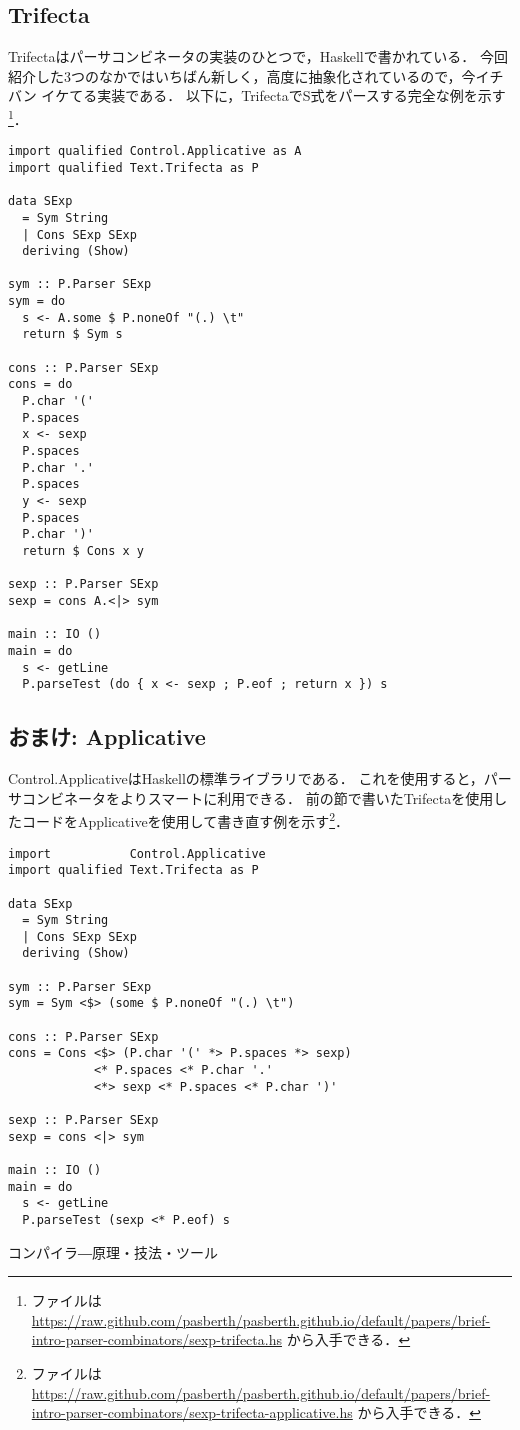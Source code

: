 \documentclass{jarticle}
\begin{document}
\subsection{Trifecta}

Trifectaはパーサコンビネータの実装のひとつで，Haskellで書かれている．
今回紹介した3つのなかではいちばん新しく，高度に抽象化されているので，今イチバン
イケてる実装である．
以下に，TrifectaでS式をパースする完全な例を示す\footnote{
ファイルは
\url{https://raw.github.com/pasberth/pasberth.github.io/default/papers/brief-intro-parser-combinators/sexp-trifecta.hs}
から入手できる．}．
\lstset{basicstyle=\ttfamily,}
\begin{lstlisting}
import qualified Control.Applicative as A
import qualified Text.Trifecta as P

data SExp
  = Sym String
  | Cons SExp SExp
  deriving (Show)

sym :: P.Parser SExp
sym = do
  s <- A.some $ P.noneOf "(.) \t"
  return $ Sym s

cons :: P.Parser SExp
cons = do
  P.char '('
  P.spaces
  x <- sexp
  P.spaces
  P.char '.'
  P.spaces
  y <- sexp
  P.spaces
  P.char ')'
  return $ Cons x y

sexp :: P.Parser SExp
sexp = cons A.<|> sym

main :: IO ()
main = do
  s <- getLine
  P.parseTest (do { x <- sexp ; P.eof ; return x }) s
\end{lstlisting}

\subsection{おまけ: Applicative}

Control.ApplicativeはHaskellの標準ライブラリである．
これを使用すると，パーサコンビネータをよりスマートに利用できる．
前の節で書いたTrifectaを使用したコードをApplicativeを使用して書き直す例を示す\footnote{
ファイルは
\url{https://raw.github.com/pasberth/pasberth.github.io/default/papers/brief-intro-parser-combinators/sexp-trifecta-applicative.hs}
から入手できる．}．
\begin{lstlisting}
import           Control.Applicative
import qualified Text.Trifecta as P

data SExp
  = Sym String
  | Cons SExp SExp
  deriving (Show)

sym :: P.Parser SExp
sym = Sym <$> (some $ P.noneOf "(.) \t")

cons :: P.Parser SExp
cons = Cons <$> (P.char '(' *> P.spaces *> sexp)
            <* P.spaces <* P.char '.'
            <*> sexp <* P.spaces <* P.char ')'

sexp :: P.Parser SExp
sexp = cons <|> sym

main :: IO ()
main = do
  s <- getLine
  P.parseTest (sexp <* P.eof) s
\end{lstlisting}

\begin{thebibliography}{数字}
 コンパイラ―原理・技法・ツール
\end{thebibliography}
\end{document}
